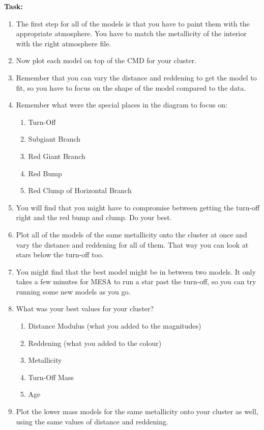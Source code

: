 \documentclass{article}
\begin{document}
\textbf{Task:}
\begin{enumerate}
\setlength{\itemsep}{0pt}
\item
The first step for all of the models is that you have to paint them with the appropriate atmosphere.  You have to match the metallicity of the interior with the right atmosphere file.
\item 
Now plot each model on top of the CMD for your cluster.
\item
Remember that you can vary the distance and reddening to get the model to fit, so you have to focus on the shape of the model compared to the data.
\item Remember what were the special places in the diagram to focus on:
\begin{enumerate}
\setlength{\itemsep}{0pt}
    \item Turn-Off
    \item Subgiant Branch
    \item Red Giant Branch
    \item Red Bump
    \item Red Clump of Horizontal Branch
\end{enumerate}
\item You will find that you might have to compromise between getting the turn-off right and the red bump and clump.  Do your best.  
\item Plot all of the models of the same metallicity onto the cluster at once and vary the distance and reddening for all of them.  That way you can look at stars below the turn-off too.  
\item You might find that the best model might be in between two models. It only takes a few minutes for MESA to run a star past the turn-off, so you can try running some new models as you go.
\item What was your best values for your cluster?
\begin{enumerate}
\setlength{\itemsep}{0pt}
    \item Distance Modulus (what you added to the magnitudes)
    \item Reddening (what you added to the colour)
    \item Metallicity
    \item Turn-Off Mass
    \item Age
\end{enumerate}
\item Plot the lower mass models for the same metallicity onto your cluster as well, using the same values of distance and reddening.
\end{enumerate}
\end{document}
